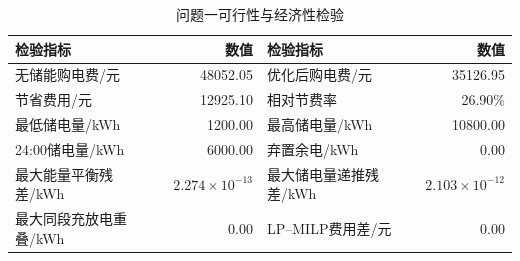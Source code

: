 \begin{table}[H]\centering\small
\caption{问题一可行性与经济性检验}\label{tab:q1-validation}
\begin{tabular}{lrlr}\toprule
检验指标 & 数值 & 检验指标 & 数值 \\\midrule
无储能购电费/元 & 48052.05 & 优化后购电费/元 & 35126.95\\
节省费用/元 & 12925.10 & 相对节费率 & 26.90\%\\
最低储电量/kWh & 1200.00 & 最高储电量/kWh & 10800.00\\
24:00储电量/kWh & 6000.00 & 弃置余电/kWh & 0.00\\
最大能量平衡残差/kWh & $2.274\times10^{-13}$ & 最大储电量递推残差/kWh & $2.103\times10^{-12}$\\
最大同段充放电重叠/kWh & 0.00 & LP--MILP费用差/元 & 0.00\\\bottomrule
\end{tabular}\end{table}
